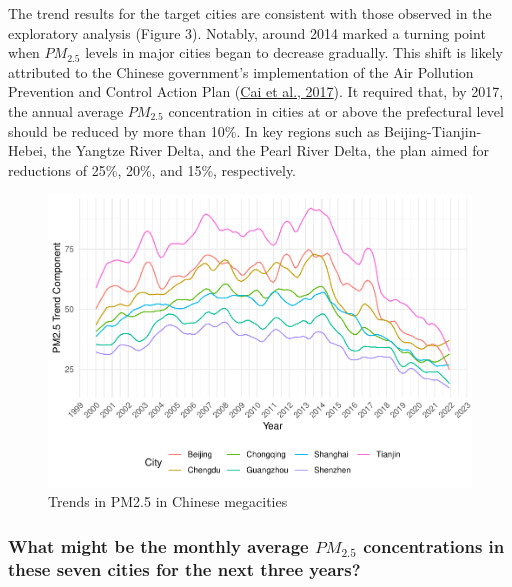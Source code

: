 \documentclass[
  12pt,
]{article}
\begin{document}
The trend results for the target cities are consistent with those
observed in the exploratory analysis (Figure 3). Notably, around 2014
marked a turning point when \(PM_{2.5}\) levels in major cities began to
decrease gradually. This shift is likely attributed to the Chinese
government's implementation of the Air Pollution Prevention and Control
Action Plan (\protect\hyperlink{ref-plan}{Cai et al., 2017}). It
required that, by 2017, the annual average \(PM_{2.5}\) concentration in
cities at or above the prefectural level should be reduced by more than
10\%. In key regions such as Beijing-Tianjin-Hebei, the Yangtze River
Delta, and the Pearl River Delta, the plan aimed for reductions of 25\%,
20\%, and 15\%, respectively.

\begin{figure}
\centering
\includegraphics{LiFangRenZhang_ENV872_Project_files/figure-latex/trend figure-1.pdf}
\caption{Trends in PM2.5 in Chinese megacities}
\end{figure}

\hypertarget{what-might-be-the-monthly-average-pm_2.5-concentrations-in-these-seven-cities-for-the-next-three-years}{%
\subsubsection{\texorpdfstring{What might be the monthly average
\(PM_{2.5}\) concentrations in these seven cities for the next three
years?}{What might be the monthly average PM\_\{2.5\} concentrations in these seven cities for the next three years?}}\label{what-might-be-the-monthly-average-pm_2.5-concentrations-in-these-seven-cities-for-the-next-three-years}}
\end{document}
